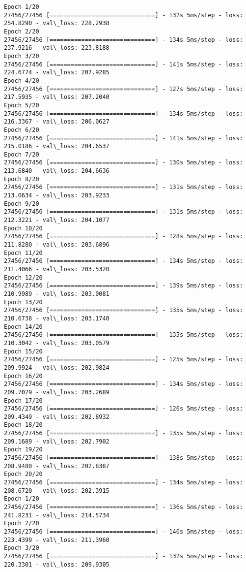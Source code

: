 \documentclass[11pt]{article}
\begin{document}
    \begin{Verbatim}[commandchars=\\\{\}]
Epoch 1/20
27456/27456 [==============================] - 132s 5ms/step - loss: 254.8290 - val\_loss: 228.2938
Epoch 2/20
27456/27456 [==============================] - 134s 5ms/step - loss: 237.9216 - val\_loss: 223.8188
Epoch 3/20
27456/27456 [==============================] - 141s 5ms/step - loss: 224.6774 - val\_loss: 207.9285
Epoch 4/20
27456/27456 [==============================] - 127s 5ms/step - loss: 217.5935 - val\_loss: 207.2040
Epoch 5/20
27456/27456 [==============================] - 134s 5ms/step - loss: 216.3367 - val\_loss: 206.0627
Epoch 6/20
27456/27456 [==============================] - 141s 5ms/step - loss: 215.0186 - val\_loss: 204.6537
Epoch 7/20
27456/27456 [==============================] - 130s 5ms/step - loss: 213.6840 - val\_loss: 204.6636
Epoch 8/20
27456/27456 [==============================] - 131s 5ms/step - loss: 213.0634 - val\_loss: 203.9233
Epoch 9/20
27456/27456 [==============================] - 131s 5ms/step - loss: 212.3221 - val\_loss: 204.1077
Epoch 10/20
27456/27456 [==============================] - 128s 5ms/step - loss: 211.8280 - val\_loss: 203.6896
Epoch 11/20
27456/27456 [==============================] - 134s 5ms/step - loss: 211.4066 - val\_loss: 203.5320
Epoch 12/20
27456/27456 [==============================] - 139s 5ms/step - loss: 210.9989 - val\_loss: 203.0081
Epoch 13/20
27456/27456 [==============================] - 135s 5ms/step - loss: 210.6738 - val\_loss: 203.1740
Epoch 14/20
27456/27456 [==============================] - 135s 5ms/step - loss: 210.3042 - val\_loss: 203.0579
Epoch 15/20
27456/27456 [==============================] - 125s 5ms/step - loss: 209.9924 - val\_loss: 202.9824
Epoch 16/20
27456/27456 [==============================] - 134s 5ms/step - loss: 209.7079 - val\_loss: 203.2689
Epoch 17/20
27456/27456 [==============================] - 126s 5ms/step - loss: 209.4349 - val\_loss: 202.8932
Epoch 18/20
27456/27456 [==============================] - 135s 5ms/step - loss: 209.1689 - val\_loss: 202.7902
Epoch 19/20
27456/27456 [==============================] - 138s 5ms/step - loss: 208.9480 - val\_loss: 202.8387
Epoch 20/20
27456/27456 [==============================] - 134s 5ms/step - loss: 208.6720 - val\_loss: 202.3915
Epoch 1/20
27456/27456 [==============================] - 136s 5ms/step - loss: 241.8231 - val\_loss: 214.5734
Epoch 2/20
27456/27456 [==============================] - 140s 5ms/step - loss: 223.4399 - val\_loss: 211.3960
Epoch 3/20
27456/27456 [==============================] - 132s 5ms/step - loss: 220.3301 - val\_loss: 209.9305

\end{Verbatim}
\end{document}

